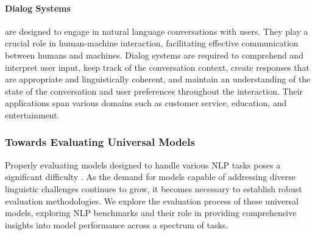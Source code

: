 \paragraph{Dialog Systems} are designed to engage in natural language conversations with users. They play a crucial role in human-machine interaction, facilitating effective communication between humans and machines. Dialog systems are required to comprehend and interpret user input, keep track of the conversation context, create responses that are appropriate and linguistically coherent, and maintain an understanding of the state of the conversation and user preferences throughout the interaction. Their applications span various domains such as customer service, education, and entertainment. \\

\subsubsection{Towards Evaluating Universal Models}

Properly evaluating models designed to handle various \ac{NLP} tasks poses a significant difficulty \citep{jones2005some}. As the demand for models capable of addressing diverse linguistic challenges continues to grow, it becomes necessary to establish robust evaluation methodologies. We explore the evaluation process of these universal models, exploring \ac{NLP} benchmarks and their role in providing comprehensive insights into model performance across a spectrum of tasks.

